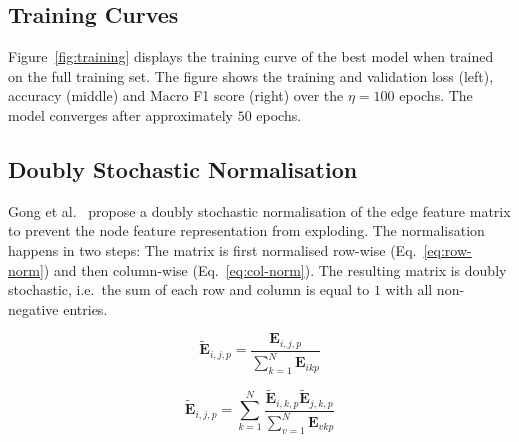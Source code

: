 \documentclass[10pt,conference,compsocconf]{IEEEtran}
\begin{document}
\subsection{Training Curves}

Figure~\ref{fig:training} displays the training curve of the best model when
trained on the full training set. The figure shows the training and validation
loss (left), accuracy (middle) and Macro F1 score (right) over the $\eta = 100$
epochs. The model converges after approximately $50$ epochs.

\subsection{Doubly Stochastic Normalisation}

Gong et al.~\cite{egnn} propose a doubly stochastic normalisation of the edge
feature matrix to prevent the node feature representation from exploding. The
normalisation happens in two steps: The matrix is first normalised row-wise
(Eq.~\ref{eq:row-norm}) and then column-wise (Eq.~\ref{eq:col-norm}). The
resulting matrix is doubly stochastic, i.e.\ the sum of each row and column is
equal to $1$ with all non-negative entries.

\begin{equation}
   \tilde{\mathbf{E}}_{i,j,p} = 
   \frac{\mathbf{E}_{i,j,p}}{\sum_{k=1}^N \mathbf{E}_{ikp}}
   \label{eq:row-norm}
\end{equation}
 
\begin{equation}
  \tilde{\mathbf{E}}_{i,j,p} = 
  \sum_{k=1}^{N}
  \frac{\tilde{\mathbf{E}}_{i,k,p}\tilde{\mathbf{E}}_{j,k,p}}{\sum_{v=1}^N \mathbf{E}_{vkp}}
  \label{eq:col-norm}
\end{equation}
\end{document}
